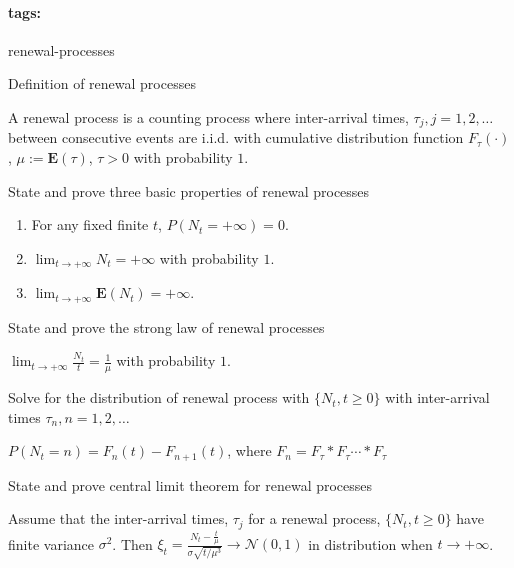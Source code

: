 \documentclass[11pt]{article}
\newcommand{\expect}[1]{\mathbf{E}(#1)}
\newcommand*{\tags}[1]{\paragraph{tags: }#1\bigskip}
\newcommand*{\xfield}[1]{\begin{mdframed}\centering #1\end{mdframed}\bigskip}
\newenvironment{field}{}{}
\newenvironment{note}{}{}
\begin{document}
%
\tags{renewal-processes}
\begin{note}
  \xfield{Definition of renewal processes}
  \begin{field}
    A renewal process is a counting process where inter-arrival times,
    \(\tau_j, j = 1,2,\ldots\) between consecutive events are
    i.i.d. with cumulative distribution function \(F_\tau(\cdot)\),
    \(\mu := \expect{\tau}\), \(\tau > 0\) with probability \(1\).
  \end{field}
\end{note}
%
\begin{note}
  \xfield{State and prove three basic properties of renewal processes}
  \begin{field}
    \begin{enumerate}
    \item For any fixed finite \(t\), \(P(N_t = +\infty) = 0\).
    \item \(\lim_{t \to +\infty} N_t = +\infty\) with probability \(1\).
    \item \(\lim_{t \to +\infty} \expect{N_t} = +\infty\).
    \end{enumerate}
  \end{field}
\end{note}
%
\begin{note}
  \xfield{State and prove the strong law of renewal processes}
  \begin{field}
    \(\lim_{t \to +\infty} \frac{N_t}{t} = \frac{1}{\mu}\) with probability \(1\).
  \end{field}
\end{note}
%
\begin{note}
  \xfield{Solve for the distribution of renewal process with \(\{N_t, t \geq 0\}\) with
    inter-arrival times \(\tau_n, n = 1,2,\ldots\)}
  \begin{field}
    \(P(N_t = n) = F_n(t) - F_{n+1}(t)\), where
    \(F_n = F_\tau * F_\tau \cdots * F_\tau\)
  \end{field}
\end{note}
%
\begin{note}
  \xfield{State and prove central limit theorem for renewal processes}
  \begin{field}
    Assume that the inter-arrival times, \(\tau_j\) for a renewal
    process, \(\{N_t, t \geq 0\}\) have finite variance
    \(\sigma^2\). Then
    \(\xi_t = \frac{N_t - \frac{t}{\mu}}{\sigma \sqrt{t / \mu^3}} \to
    \mathcal{N}(0,1)\) in distribution when \(t \to +\infty\).
  \end{field}
\end{note}
\end{document}
